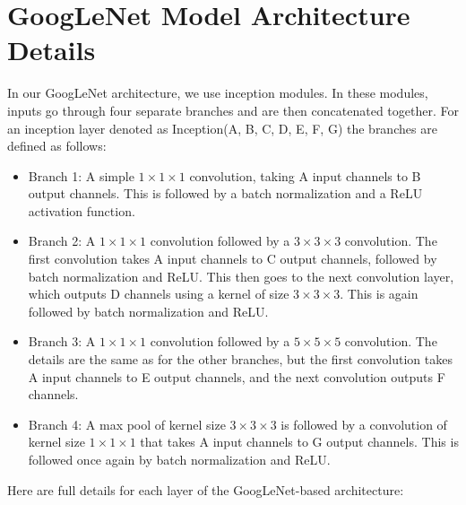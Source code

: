 \chapter{GoogLeNet Model Architecture Details}\label{app:GoogLeNet}

In our GoogLeNet architecture, we use inception modules. In these modules, inputs go through four separate branches and are then concatenated together. For an inception layer denoted as Inception(A, B, C, D, E, F, G) the branches are defined as follows:

\begin{itemize}
    \item Branch 1: A simple $1 \times 1 \times 1$ convolution, taking A input channels to B output channels. This is followed by a batch normalization and a ReLU activation function.
    \item Branch 2: A $1 \times 1 \times 1$ convolution followed by a $3 \times 3 \times 3$ convolution. The first convolution takes A input channels to C output channels, followed by batch normalization and ReLU. This then goes to the next convolution layer, which outputs D channels using a kernel of size $3 \times 3 \times 3$. This is again followed by batch normalization and ReLU.
    \item Branch 3: A $1 \times 1 \times 1$ convolution followed by a $5 \times 5 \times 5$ convolution. The details are the same as for the other branches, but the first convolution takes A input channels to E output channels, and the next convolution outputs F channels.
    \item Branch 4: A max pool of kernel size $3 \times 3 \times 3$ is followed by a convolution of kernel size $1 \times 1 \times 1$ that takes A input channels to G output channels. This is followed once again by batch normalization and ReLU.
\end{itemize}

Here are full details for each layer of the GoogLeNet-based architecture:

